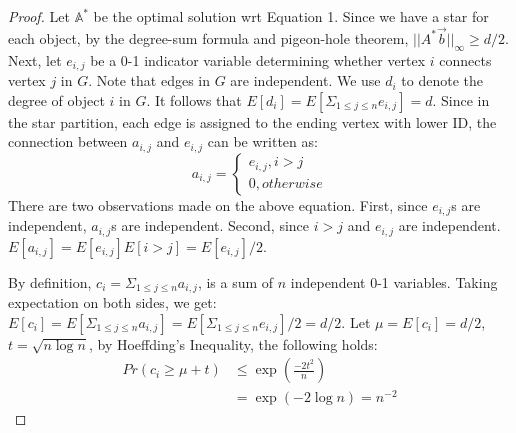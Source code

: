 \begin{proof}
Let $\mathbb{A}^*$ be the optimal solution wrt Equation 1. Since we have a star
for each object, by the degree-sum formula and pigeon-hole theorem, $||A^*\vec{b}||_\infty \geq d/2$.
Next, let $e_{i,j}$ be a 0-1 indicator variable determining whether vertex $i$ connects vertex $j$
in $G$. Note that edges in $G$ are independent. We use $d_i$ 
to denote the degree of object $i$ in $G$.  It follows that $E[d_i]=E[\Sigma_{1\leq j \leq n}e_{i,j}]=d$.
Since in the star partition, each edge is assigned to the ending vertex
with lower ID, the connection between $a_{i,j}$ and $e_{i,j}$ can be written as:
\begin{equation*}
a_{i,j} = \begin{cases}
			e_{i,j}, i>j \\
			0, otherwise
		  \end{cases}  
\end{equation*}
There are two observations made on the above equation. First, since $e_{i,j}$s are independent,
$a_{i,j}$s are independent. Second, since $i>j$ and $e_{i,j}$ are independent. 
$E[a_{i,j}] = E[e_{i,j}]E[i>j]= E[e_{i,j}]/2$.

By definition, $c_i = \Sigma_{1\leq j \leq n} a_{i,j}$, 
is a sum of $n$ independent 0-1 variables. Taking expectation on both sides, 
we get: $E[c_i] = E[\Sigma_{1\leq j \leq n} a_{i,j}]=E[\Sigma_{1\leq j \leq n} e_{i,j}]/2 = d/2$. Let $\mu =E[c_i] = d/2$, 
$t = \sqrt{n\log n}$, by Hoeffding's Inequality, the following holds:
\begin{equation*}
\begin{split}
	Pr(c_i \geq \mu + t) 
						&\leq \exp(\frac{-2t^2}{n}) \\
						&= \exp(-2\log n) = n^{-2}
\end{split}
\end{equation*}


\end{proof}
